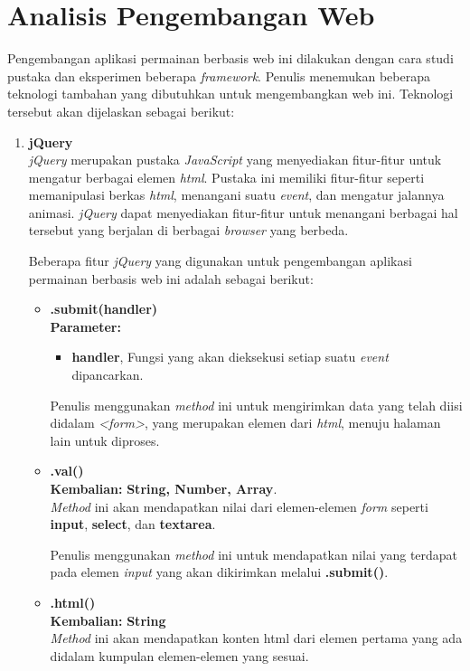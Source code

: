 \section{Analisis Pengembangan Web}
Pengembangan aplikasi permainan berbasis web ini dilakukan dengan cara studi pustaka dan eksperimen beberapa \textit{framework}. Penulis menemukan beberapa teknologi tambahan yang dibutuhkan untuk mengembangkan web ini. Teknologi tersebut akan dijelaskan sebagai berikut:
\begin{enumerate}
	\item \textbf{jQuery} \\
	\textit{jQuery} merupakan pustaka \textit{JavaScript} yang menyediakan fitur-fitur untuk mengatur berbagai elemen \textit{html}. Pustaka ini memiliki fitur-fitur seperti memanipulasi berkas \textit{html}, menangani suatu \textit{event}, dan mengatur jalannya animasi. \textit{jQuery} dapat menyediakan fitur-fitur untuk menangani berbagai hal tersebut yang berjalan di berbagai \textit{browser} yang berbeda.
	
	Beberapa fitur \textit{jQuery} yang digunakan untuk pengembangan aplikasi permainan berbasis web ini adalah sebagai berikut:
	\begin{itemize}
		\item \textbf{.submit(handler)} \\
		\textbf{Parameter:}
		\begin{itemize}
			\item \textbf{handler}, Fungsi yang akan dieksekusi setiap suatu \textit{event} dipancarkan.
		\end{itemize}
	
		Penulis menggunakan \textit{method} ini untuk mengirimkan data yang telah diisi didalam \textit{<form>}, yang merupakan elemen dari \textit{html}, menuju halaman lain untuk diproses.
		
		\item \textbf{.val()} \\
		\textbf{Kembalian:} \textbf{String, Number, Array}. \\
		\textit{Method} ini akan mendapatkan nilai dari elemen-elemen \textit{form} seperti \textbf{input}, \textbf{select}, dan \textbf{textarea}.
		
		Penulis menggunakan \textit{method} ini untuk mendapatkan nilai yang terdapat pada elemen \textit{input} yang akan dikirimkan melalui \textbf{.submit()}.
		
		\item \textbf{.html()} \\
		\textbf{Kembalian:} \textbf{String} \\
		\textit{Method} ini akan mendapatkan konten html dari elemen pertama yang ada didalam kumpulan elemen-elemen yang sesuai.
		

\end{itemize}
\end{enumerate}
